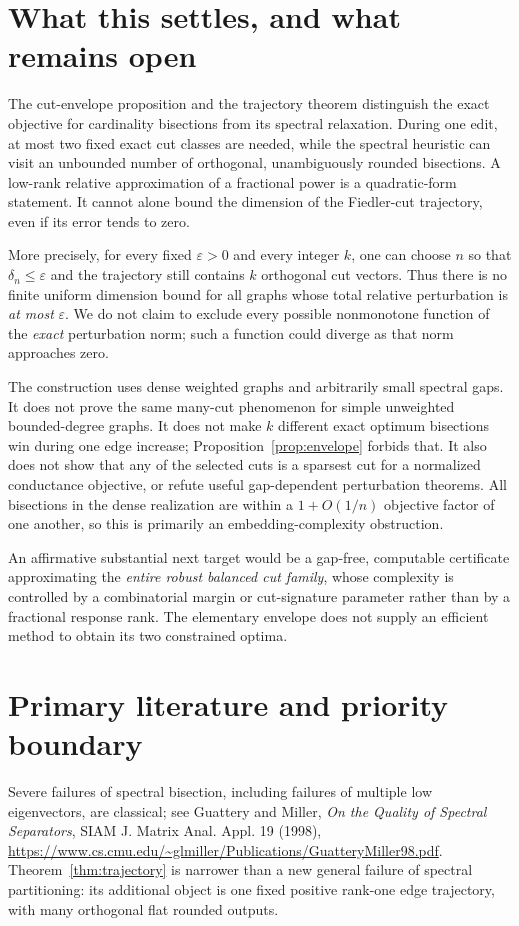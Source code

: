 \documentclass[11pt]{article}
\newcommand{\eps}{\varepsilon}
\begin{document}
\section*{What this settles, and what remains open}
The cut-envelope proposition and the trajectory theorem distinguish
the exact objective for cardinality bisections from its spectral
relaxation. During one edit, at most two fixed exact cut classes are
needed, while the spectral heuristic can visit an unbounded number
of orthogonal, unambiguously rounded bisections. A low-rank relative
approximation of a fractional power is a quadratic-form statement.
It cannot alone bound the dimension of the Fiedler-cut trajectory,
even if its error tends to zero.

More precisely, for every fixed $\eps>0$ and every integer $k$, one can
choose $n$ so that $\delta_n\le\eps$ and the trajectory still contains
$k$ orthogonal cut vectors. Thus there is no finite uniform dimension
bound for all graphs whose total relative perturbation is \emph{at most}
$\eps$. We do not claim to exclude every possible nonmonotone function
of the \emph{exact} perturbation norm; such a function could diverge
as that norm approaches zero.

The construction uses dense weighted graphs and arbitrarily small
spectral gaps. It does not prove the same many-cut phenomenon for
simple unweighted bounded-degree graphs. It does not make $k$
different exact optimum bisections win during one edge increase;
Proposition~\ref{prop:envelope} forbids that. It also does not show
that any of the selected cuts is a sparsest cut for a normalized
conductance objective, or refute useful gap-dependent perturbation
theorems. All bisections in the dense realization are within a
$1+O(1/n)$ objective factor of one another, so this is primarily an
embedding-complexity obstruction.

An affirmative substantial next target would be a gap-free,
computable certificate approximating the \emph{entire robust balanced
cut family}, whose complexity is controlled by a combinatorial
margin or cut-signature parameter rather than by a fractional
response rank. The elementary envelope does not supply an efficient
method to obtain its two constrained optima.

\section*{Primary literature and priority boundary}
Severe failures of spectral bisection, including failures of multiple
low eigenvectors, are classical; see Guattery and Miller,
\emph{On the Quality of Spectral Separators}, SIAM J. Matrix Anal.
Appl. 19 (1998),
\url{https://www.cs.cmu.edu/~glmiller/Publications/GuatteryMiller98.pdf}.
Theorem~\ref{thm:trajectory} is narrower than a new general failure
of spectral partitioning: its additional object is one fixed positive
rank-one edge trajectory, with many orthogonal flat rounded outputs.
\end{document}
